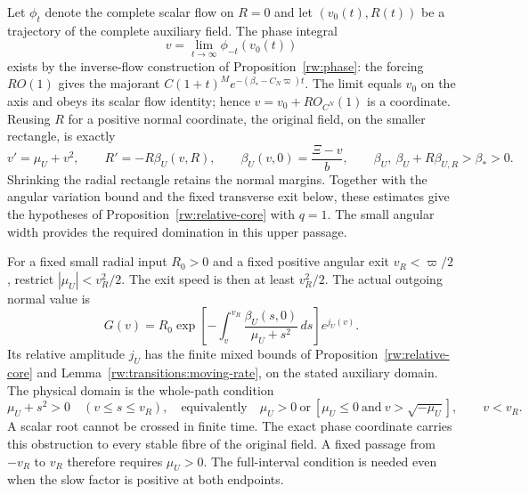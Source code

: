 Let $\phi_t$ denote the complete scalar flow on $R=0$ and let
$(v_0(t),R(t))$ be a trajectory of the complete auxiliary field. The
phase integral
\[
 v=\lim_{t\longrightarrow\infty}\phi_{-t}(v_0(t))
\]
exists by the inverse-flow construction of Proposition~\ref{rw:phase}:
the forcing $RO(1)$ gives the majorant
$C(1+t)^Me^{-(\beta_*-C_N\varpi)t}$. The limit equals $v_0$ on the
axis and obeys its scalar flow identity; hence $v=v_0+RO_{C^N}(1)$
is a coordinate. Reusing $R$ for a positive normal coordinate, the original
field, on the smaller rectangle, is exactly
\begin{equation}\label{rw:upper:repeated-normal}
 v'=\mu_U+v^2,
 \qquad R'=-R\beta_U(v,R),\qquad
 \beta_U(v,0)=\frac{\Xi-v}{b},\qquad
 \beta_U,\ \beta_U+R\beta_{U,R}>\beta_*>0.
\end{equation}
Shrinking the radial rectangle retains the normal margins. Together
with the angular variation bound and the fixed transverse exit below,
these estimates give the hypotheses of
Proposition~\ref{rw:relative-core} with $q=1$. The small angular width
provides the required domination in this upper passage.

For a fixed small radial input $R_0>0$ and a fixed positive angular
exit $v_R<\varpi/2$, restrict $|\mu_U|<v_R^2/2$. The exit speed
is then at least $v_R^2/2$. The actual outgoing normal value is
\begin{equation}\label{rw:upper:repeated-output}
 G(v)=R_0\exp\left[-\int_v^{v_R}
       \frac{\beta_U(s,0)}{\mu_U+s^2}\,ds\right]e^{j_U(v)}.
\end{equation}
Its relative amplitude $j_U$ has the finite mixed bounds of
Proposition~\ref{rw:relative-core} and
Lemma~\ref{rw:transitions:moving-rate}, on the stated auxiliary
domain. The physical domain is the whole-path condition
\begin{equation}\label{rw:upper:quadratic-passing}
 \mu_U+s^2>0\quad(v\le s\le v_R),
 \quad\text{equivalently}\quad
 \mu_U>0\ \text{or}\
 [\mu_U\le0\ \text{and}\ v>\sqrt{-\mu_U}],
 \qquad v<v_R.
\end{equation}
A scalar root cannot be crossed in finite time.  The exact phase
coordinate carries this obstruction to every stable fibre of the
original field.  A fixed passage from
$-v_R$ to $v_R$ therefore requires $\mu_U>0$.  The full-interval
condition is needed even when the slow factor is positive at both
endpoints.

